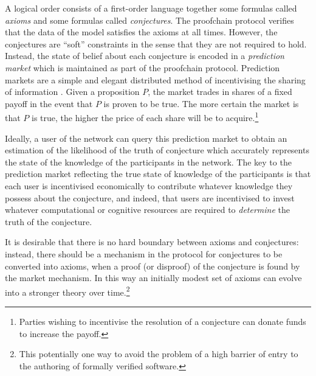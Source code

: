 \documentclass[english,letter paper,12pt,reqno]{article}
\theoremstyle{example}
\begin{document}


A logical order consists of a first-order language together some formulas called \emph{axioms} and some formulas called \emph{conjectures}. The proofchain protocol verifies that the data of the model satisfies the axioms at all times. However, the conjectures are ``soft'' constraints in the sense that they are not required to hold. Instead, the state of belief about each conjecture is encoded in a \emph{prediction market} which is maintained as part of the proofchain protocol. Prediction markets are a simple and elegant distributed method of incentivising the sharing of information \cite{hanson3}. Given a proposition $P$, the market trades in shares of a fixed payoff in the event that $P$ is proven to be true. The more certain the market is that $P$ is true, the higher the price of each share will be to acquire.\footnote{Parties wishing to incentivise the resolution of a conjecture can donate funds to increase the payoff.}

Ideally, a user of the network can query this prediction market to obtain an estimation of the likelihood of the truth of conjecture which accurately represents the state of the knowledge of the participants in the network. The key to the prediction market reflecting the true state of knowledge of the participants is that each user is incentivised economically to contribute whatever knowledge they possess about the conjecture, and indeed, that users are incentivised to invest whatever computational or cognitive resources are required to \emph{determine} the truth of the conjecture.

It is desirable that there is no hard boundary between axioms and conjectures: instead, there should be a mechanism in the protocol for conjectures to be converted into axioms, when a proof (or disproof) of the conjecture is found by the market mechanism. In this way an initially modest set of axioms can evolve into a stronger theory over time.\footnote{This potentially one way to avoid the problem of a high barrier of entry to the authoring of formally verified software.}
\vspace{0.2cm}
\end{document}
